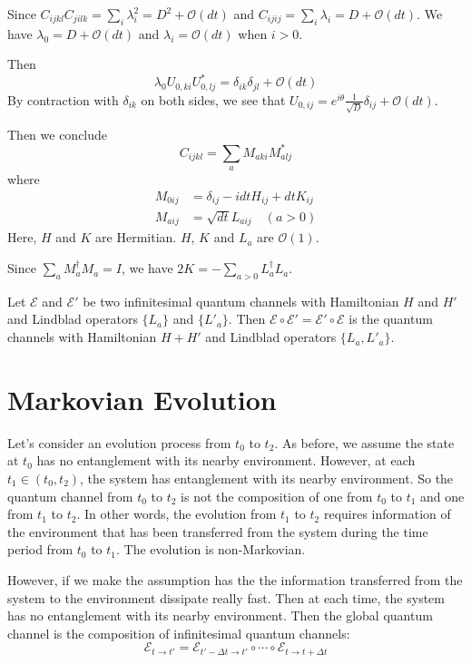 \documentclass[12pt]{book}
\begin{document}
Since $C_{ijkl}C_{jilk}=\sum_i\lambda_i^2=D^2+\mathcal O(dt)$ and $C_{ijij}=\sum_i\lambda_i=D+\mathcal O(dt)$. We have $\lambda_0=D+\mathcal O(dt)$ and $\lambda_i=\mathcal O(dt)$ when $i>0$.
 
Then
\begin{equation}
	\lambda_0U_{0,ki}U^*_{0,lj}=\delta_{ik}\delta_{jl}+\mathcal O(dt)
\end{equation}
By contraction with $\delta_{ik}$ on both sides, we see that $U_{0,ij}=e^{i\theta}\frac 1{\sqrt D}\delta_{ij}+\mathcal O(dt)$.

Then we conclude
\begin{equation}
	C_{ijkl}=\sum_a M_{aki}M^*_{alj}
\end{equation}
where
\begin{align}
	M_{0ij}&=\delta_{ij}-idtH_{ij}+dtK_{ij}\\
	M_{aij}&=\sqrt{dt} L_{aij}\quad(a>0)
\end{align}
Here, $H$ and $K$ are Hermitian. $H$, $K$ and $L_a$ are $\mathcal O(1)$. 

Since  $\sum_a M_a^\dagger M_a=I$, we have $2K=-\sum_{a>0}L_a^\dagger L_a$.

Let $\mathcal E$ and $\mathcal E'$ be two infinitesimal quantum channels with Hamiltonian $H$ and $H'$ and Lindblad operators $\{L_a\}$ and $\{L'_a\}$. Then $\mathcal E\circ\mathcal E'=\mathcal E'\circ \mathcal E$ is the quantum channels with Hamiltonian $H+H'$ and Lindblad operators $\{L_a,L'_a\}$.

\section{Markovian Evolution}

Let's consider an evolution process from $t_0$ to $t_2$. As before, we assume the state at $t_0$ has no entanglement with its nearby environment. However, at each $t_1\in (t_0,t_2)$, the system has entanglement with its nearby environment. So the quantum channel from $t_0$ to $t_2$ is not the composition of one from $t_0$ to $t_1$ and one from $t_1$ to $t_2$. In other words, the evolution from $t_1$ to $t_2$ requires information of the environment that has been transferred from the system during the time period from $t_0$ to $t_1$. The evolution is non-Markovian.

However, if we make the assumption has the the information transferred from the system to the environment dissipate really fast. Then at each time, the system has no entanglement with its nearby environment. Then the global quantum channel is the composition of infinitesimal quantum channels:
\begin{equation}
	\mathcal E_{t\rightarrow t'}=\mathcal E_{t'-\Delta t\rightarrow t'}\circ\cdots\circ\mathcal E_{t\rightarrow t+\Delta t}
\end{equation}
\end{document}
